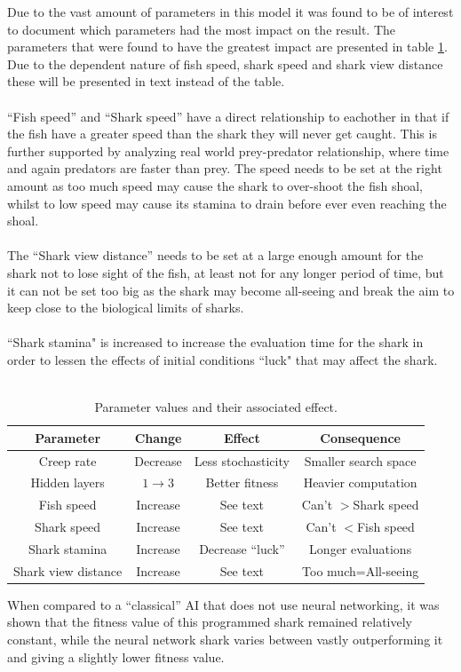 Due to the vast amount of parameters in this model it was found to be of
interest to document which parameters had the most impact on the result. The
parameters that were found to have the greatest impact are presented in table
\ref{tab:params}. Due to the dependent nature of fish speed, shark
speed and shark view distance these will be presented in text instead of the
table.\\
\\
``Fish speed'' and ``Shark speed'' have a direct relationship to
eachother in that if the fish have a greater speed than the shark they will
never get caught. This is further supported by analyzing real world
prey-predator relationship, where time and again predators are faster than
prey. The speed needs to be set at the right amount as too much speed may cause
the shark to over-shoot the fish shoal, whilst to low speed may cause its
stamina to drain before ever even reaching the shoal.\\
\\
The ``Shark view
distance'' needs to be set at a large enough amount for the shark not to lose
sight of the fish, at least not for any longer period of time, but it can not
be set too big as the shark may become all-seeing and break the aim to keep
close to the biological limits of sharks.\\
\\
``Shark stamina" is increased to
increase the evaluation time for the shark in order to lessen the effects of
initial conditions ``luck" that may affect the shark.\\
\\
\begin{table}[h]
\begin{tabular}{|c|c|c|c|}
\hline
\textbf{Parameter} & \textbf{Change} & \textbf{Effect} & \textbf{Consequence}\\
\hline
Creep rate & Decrease & Less stochasticity & Smaller search space \\
\hline
Hidden layers & $1\rightarrow3$ & Better fitness &  Heavier computation\\
\hline
\hline
Fish speed & Increase & See text & Can't $>$Shark speed \\
\hline
Shark speed & Increase & See text & Can't $<$Fish speed \\
\hline
\hline
Shark stamina & Increase & Decrease ``luck'' & Longer evaluations
\\
\hline
Shark view distance & Increase & See text & Too much=All-seeing \\
\hline
\end{tabular}
\caption{Parameter values and their associated effect.}
\label{tab:params}
\end{table}

When compared to a ``classical'' AI that does not use neural networking, it was
shown that the fitness value of this programmed shark remained relatively
constant, while the neural network shark varies between vastly outperforming it
and giving a slightly lower fitness value.

